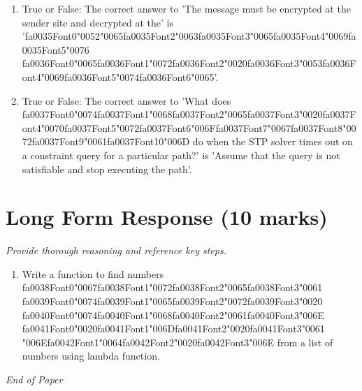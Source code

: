 \documentclass[12pt]{article}
\begin{document}
\begin{enumerate}[label=\arabic*.]
\item True or False: The correct answer to 'The message must be encrypted at the sender site and decrypted at the' is '{\csname fa0035Font0\endcsname\char"0052}{\char"0065}{\csname fa0035Font2\endcsname\char"0063}{\csname fa0035Font3\endcsname\char"0065}{\csname fa0035Font4\endcsname\char"0069}{\csname fa0035Font5\endcsname\char"0076} {\csname fa0036Font0\endcsname\char"0065}{\csname fa0036Font1\endcsname\char"0072}{\csname fa0036Font2\endcsname\char"0020}{\csname fa0036Font3\endcsname\char"0053}{\csname fa0036Font4\endcsname\char"0069}{\csname fa0036Font5\endcsname\char"0074}{\csname fa0036Font6\endcsname\char"0065}'.
\item True or False: The correct answer to 'What does {\csname fa0037Font0\endcsname\char"0074}{\csname fa0037Font1\endcsname\char"0068}{\csname fa0037Font2\endcsname\char"0065}{\csname fa0037Font3\endcsname\char"0020}{\csname fa0037Font4\endcsname\char"0070}{\csname fa0037Font5\endcsname\char"0072}{\csname fa0037Font6\endcsname\char"006F}{\csname fa0037Font7\endcsname\char"0067}{\csname fa0037Font8\endcsname\char"0072}{\csname fa0037Font9\endcsname\char"0061}{\csname fa0037Font10\endcsname\char"006D} do when the STP solver times out on a constraint query for a particular path?' is 'Assume that the query is not satisfiable and stop executing the path'.
\end{enumerate}

\section*{Long Form Response (10 marks)}
\textit{Provide thorough reasoning and reference key steps.}
\begin{enumerate}[label=\arabic*.]
\item Write a function to find numbers {\csname fa0038Font0\endcsname\char"0067}{\csname fa0038Font1\endcsname\char"0072}{\csname fa0038Font2\endcsname\char"0065}{\csname fa0038Font3\endcsname\char"0061} {\csname fa0039Font0\endcsname\char"0074}{\csname fa0039Font1\endcsname\char"0065}{\csname fa0039Font2\endcsname\char"0072}{\csname fa0039Font3\endcsname\char"0020} {\csname fa0040Font0\endcsname\char"0074}{\csname fa0040Font1\endcsname\char"0068}{\csname fa0040Font2\endcsname\char"0061}{\csname fa0040Font3\endcsname\char"006E} {\csname fa0041Font0\endcsname\char"0020}{\csname fa0041Font1\endcsname\char"006D}{\csname fa0041Font2\endcsname\char"0020}{\csname fa0041Font3\endcsname\char"0061} {\char"006E}{\csname fa0042Font1\endcsname\char"0064}{\csname fa0042Font2\endcsname\char"0020}{\csname fa0042Font3\endcsname\char"006E} from a list of numbers using lambda
function.
\end{enumerate}

\vfill
\noindent\textit{End of Paper}
\end{document}
